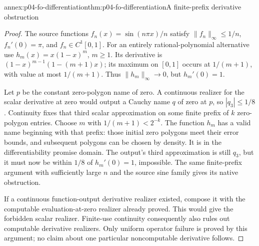 \begin{annexitem}{annex:p04-fo-differentiation}{thm:p04-fo-differentiation}{A finite-prefix derivative obstruction}
\begin{proof}
The source functions \(f_n(x)=\sin(n\pi x)/n\) satisfy
\(\lVert f_n\rVert_\infty\leq1/n\), \(f_n'(0)=\pi\),
and \(f_n\in C^1[0,1]\).
For an entirely rational-polynomial alternative use
\(h_m(x)=x(1-x)^m\), \(m\geq1\).
Its derivative is
\((1-x)^{m-1}(1-(m+1)x)\); its maximum on \([0,1]\)
occurs at \(1/(m+1)\), with value at most \(1/(m+1)\).
Thus \(\lVert h_m\rVert_\infty\to0\), but \(h_m'(0)=1\).

Let \(p\) be the constant zero-polygon name of zero.
A continuous realizer for the scalar derivative at zero
would output a Cauchy name \(q\) of zero at \(p\), so
\(|q_3|\leq1/8\).
Continuity fixes that third scalar approximation on some
finite prefix of \(k\) zero-polygon entries.
Choose \(m\) with \(1/(m+1)<2^{-k}\).
The function \(h_m\) has a valid name beginning with that
prefix: those initial zero polygons meet their error bounds,
and subsequent polygons can be chosen by density.
It is in the differentiability promise domain.
The output's third approximation is still \(q_3\), but
it must now be within \(1/8\) of \(h_m'(0)=1\), impossible.
The same finite-prefix argument with sufficiently large
\(n\) and the source sine family gives its native obstruction.

If a continuous function-output derivative realizer existed,
compose it with the computable evaluation-at-zero realizer
already proved. This would give the forbidden scalar
realizer. Finite-use continuity consequently also rules out
computable derivative realizers.
Only uniform operator failure is proved by this argument;
no claim about one particular noncomputable derivative follows.
\end{proof}
\end{annexitem}

